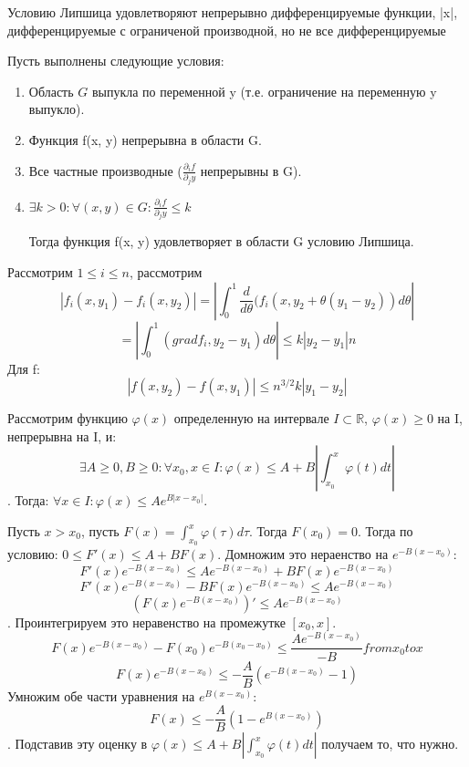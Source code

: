 \documentclass[document.tex]{subfiles}
\begin{document}
\begin{Remark}
Условию Липшица удовлетворяют непрерывно дифференцируемые функции, |x|, дифференцируемые с ограниченой производной, но не все дифференцируемые
\end{Remark}
\begin{Lemma}
Пусть выполнены следующие условия:
\begin{enumerate}
\item Область $G$ выпукла по переменной y (т.е. ограничение на переменную y выпукло).
\item Функция f(x, y) непрерывна в области G.
\item Все частные производные ($\frac{\partial_i f}{\partial_j y}$ непрерывны в G).
\item $\exists k > 0: \forall (x, y) \in G : \frac{\partial_i f}{\partial_j y} \leq k$

Тогда функция f(x, y) удовлетворяет в области G условию Липшица.
\end{enumerate}
\end{Lemma}
\begin{Proof}
Рассмотрим $1 \leq i \leq n$, рассмотрим 
$$|f_i(x, y_1) - f_i(x, y_2)| = |\int_0^1 \frac{d}{d \theta}(f_i(x, y_2 + \theta(y_1 - y_2))d \theta|$$
$$ = |\int_0^1 (grad f_i, y_2 - y_1)d\theta| \leq k |y_2 - y_1| n$$
Для f:
$$|f(x, y_2) - f(x, y_1)| \leq n^{3/2} k |y_1 - y_2|$$
\end{Proof}

\begin{Lemma}[Гронуолла]
Рассмотрим функцию $\varphi(x)$ определенную на интервале $I \subset \mathbb{R}$, $\varphi(x) \geq 0$ на I, непрерывна на I, и:
$$\exists A \geq 0, B \geq 0 : \forall x_0, x \in I: \varphi(x) \leq A+B|\int_{x_0}^x \varphi(t) dt|$$.
Тогда: $\forall x \in I : \varphi(x) \leq Ae^{B|x - x_0|}$.
\end{Lemma}
\begin{Proof}
Пусть $x > x_0$, пусть $F(x) = \int_{x_0}^x \varphi(\tau) d\tau$. Тогда $F(x_0) = 0$. Тогда по условию: $0 \leq F'(x) \leq A + BF(x)$. Домножим это нераенство на $e^{-B(x - x_0)}$:
$$F'(x)e^{-B(x - x_0)} \leq Ae^{-B(x - x_0)} + BF(x)e^{-B(x - x_0)}$$
$$F'(x)e^{-B(x-x_0)} - BF(x)e^{-B(x - x_0)} \leq Ae^{-B(x - x_0)}$$
$$(F(x)e^{-B(x-x_0)})' \leq Ae^{-B(x - x_0)}$$.
Проинтегрируем это неравенство на промежутке $[x_0, x]$.
$$F(x)e^{-B(x-x_0)} - F(x_0)e^{-B(x_0-x_0)} \leq \frac{Ae^{-B(x - x_0)}}{-B} from x_0 to x$$
$$F(x)e^{-B(x-x_0)} \leq -\frac{A}{B}(e^{-B(x - x_0)} - 1)$$
Умножим обе части уравнения на $e^{B(x - x_0)}$:
$$F(x) \leq -\frac{A}{B}(1 - e^{B(x - x_0)})$$.
Подставив эту оценку в $\varphi(x) \leq A+B|\int_{x_0}^x \varphi(t) dt|$ получаем то, что нужно.
\end{Proof}
\end{document}
